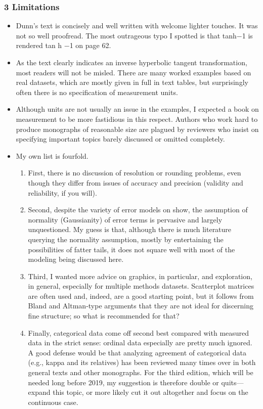 \begin{frame}

\frametitle{3 Limitations}

\begin{itemize}

\item Dunn’s text is concisely and well written with welcome lighter touches. It was not so
well proofread. The most outrageous typo I spotted is that tanh−1
is rendered tan h
−1
on page 62. 




\item As the text clearly indicates an inverse hyperbolic tangent transformation, most readers will not be misled. There are many worked examples based on real
datasets, which are mostly given in full in text tables, but surprisingly often there is
no specification of measurement units. 
\item Although units are not usually an issue in the
examples, I expected a book on measurement to be more fastidious in this respect.
Authors who work hard to produce monographs of reasonable size are plagued by
reviewers who insist on specifying important topics barely discussed or omitted completely.

\item My own list is fourfold.

\begin{enumerate}
\item First, there is no discussion of resolution or rounding problems, even though they
differ from issues of accuracy and precision (validity and reliability, if you will).
\item  Second, despite the variety of error models on show, the assumption of normality
(Gaussianity) of error terms is pervasive and largely unquestioned. My guess is that,
although there is much literature querying the normality assumption, mostly by entertaining
the possibilities of fatter tails, it does not square well with most of the modeling
being discussed here.
\item  Third, I wanted more advice on graphics, in particular, and exploration, in general,
especially for multiple methods datasets. Scatterplot matrices are often used and, indeed,
are a good starting point, but it follows from Bland and Altman-type arguments
that they are not ideal for discerning fine structure; so what is recommended for that?
\item Finally, categorical data come off second best compared with measured data in the
strict sense: ordinal data especially are pretty much ignored. A good defense would
be that analyzing agreement of categorical data (e.g., kappa and its relatives) has been
reviewed many times over in both general texts and other monographs. For the third
edition, which will be needed long before 2019, my suggestion is therefore double or
quits—expand this topic, or more likely cut it out altogether and focus on the continuous
case.
\end{enumerate}



\end{itemize}
\end{frame}

